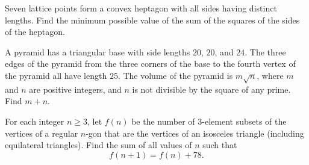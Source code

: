 \documentclass[11pt]{article}
\theoremstyle{definition}
\begin{document}
\begin{question}[name={2016 HMMT, November Theme, \href{https://artofproblemsolving.com/community/c129h1342706p7297978}{Problem 7}}]
	Seven lattice points form a convex heptagon with all sides having distinct lengths. Find the minimum possible value of the sum of the squares of the sides of the heptagon.
\end{question}




%	









\begin{question}[name={2017 AIME I, \href{https://artofproblemsolving.com/community/c4p7812780}{Problem 4}}]
	A pyramid has a triangular base with side lengths $20$, $20$, and $24$. The three edges of the pyramid from the three corners of the base to the fourth vertex of the pyramid all have length $25$. The volume of the pyramid is $m\sqrt{n}$, where $m$ and $n$ are positive integers, and $n$ is not divisible by the square of any prime. Find $m+n$.
\end{question}


%	

















\begin{question}[name={2017 AIME II, \href{https://artofproblemsolving.com/community/c4p7910357}{Problem 13}}]
	For each integer $n\ge 3$, let $f(n)$ be the number of 3-element subsets of the vertices of a regular $n$-gon that are the vertices of an isosceles triangle (including equilateral triangles). Find the sum of all values of $n$ such that $$f(n+1)=f(n)+78.$$
\end{question}


%	
\end{document}
